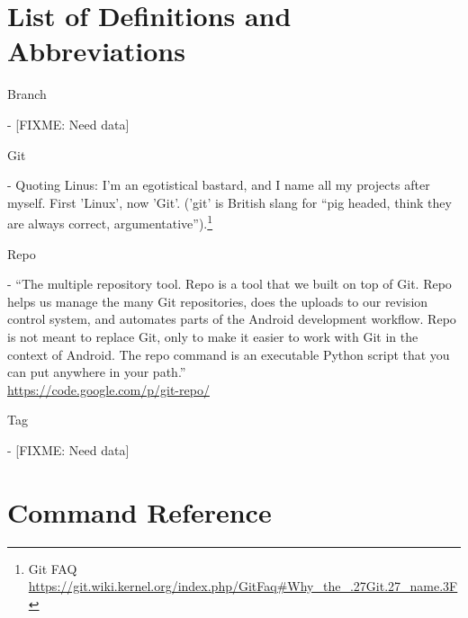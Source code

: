 \documentclass[12pt,letterpaper,dvips]{article}
\newcommand{\FIXME}[1]{\textsf{[FIXME: #1]}}
\newenvironment{itemize*}%
  {\begin{itemize}%
    \setlength{\itemsep}{0pt}%
    \setlength{\parsep}{0pt}}%
  {\end{itemize}}
\begin{document}
\section{List of Definitions and Abbreviations}
\begin{itemize*}
  \item{\begin{bf}Branch\end{bf}} - \FIXME{Need data}
  \item{\begin{bf}Git\end{bf}} - Quoting Linus: I'm an egotistical bastard,
  and I name all my projects after myself. First 'Linux', now 'Git'.
('git' is British slang for ``pig headed, think they are always correct,
    argumentative'').\footnote{Git FAQ\\
    \href{https://git.wiki.kernel.org/index.php/GitFaq\#Why\_the\_.27Git.27\_name.3F}{https://git.wiki.kernel.org/index.php/GitFaq\#Why\_the\_.27Git.27\_name.3F}}
  \item{\begin{bf}Repo\end{bf}} - ``The multiple repository tool.
    Repo is a tool that we built on top of Git.  Repo helps us
    manage the many Git repositories, does the uploads to our
    revision control system, and automates parts of the Android
    development workflow.  Repo is not meant to replace Git,
    only to make it easier to work with Git in the context of
    Android.  The repo command is an executable Python script
    that you can put anywhere in your path.''\\
    \href{https://code.google.com/p/git-repo/}{https://code.google.com/p/git-repo/}
  \item{\begin{bf}Tag\end{bf}} - \FIXME{Need data}
\end{itemize*}





\newpage
\section{Command Reference}
\end{document}
